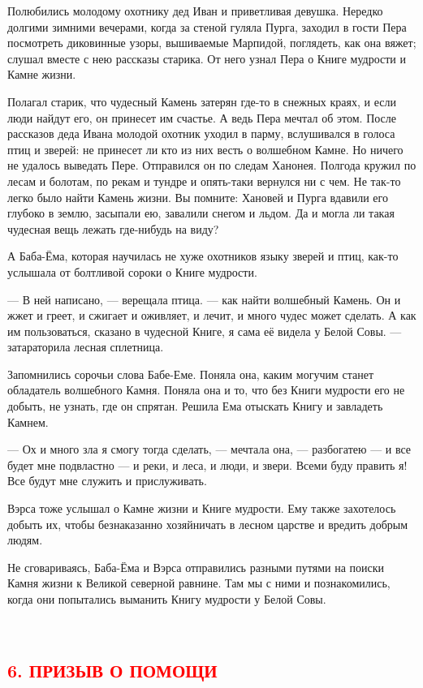 \documentclass[oneside,final,14pt]{extreport}
\begin{document}
	Полюбились молодому охотнику дед Иван и приветливая девушка. Нередко долгими зимними вечерами, когда за стеной гуляла Пурга, заходил в гости Пера посмотреть диковинные узоры, вышиваемые Марпидой, поглядеть, как она вяжет; слушал вместе с нею рассказы старика. От него узнал Пера о Книге мудрости и Камне жизни.
	
	Полагал старик, что чудесный Камень затерян где-то в снежных краях, и если люди найдут его, он принесет им счастье. А ведь Пера мечтал об этом. После рассказов деда Ивана молодой охотник уходил в парму, вслушивался в голоса птиц и зверей: не принесет ли кто из них весть о волшебном Камне. Но ничего не удалось выведать Пере. Отправился он по следам Ханонея. Полгода кружил по лесам и болотам, по рекам и тундре и опять-таки вернулся ни с чем. Не так-то легко было найти Камень жизни. Вы помните: Хановей и Пурга вдавили его глубоко в землю, засыпали ею, завалили снегом и льдом. Да и могла ли такая чудесная вещь лежать где-нибудь на виду?
	
	А Баба-Ёма, которая научилась не хуже охотников языку зверей и птиц, как-то услышала от болтливой сороки о Книге мудрости.
	
	— В ней написано, — верещала птица. — как найти волшебный Камень. Он и жжет и греет, и сжигает и оживляет, и лечит, и много чудес может сделать. А как им пользоваться, сказано в чудесной Книге, я сама её видела у Белой Совы. — затараторила лесная сплетница.
	
	Запомнились сорочьи слова Бабе-Еме. Поняла она, каким могучим станет обладатель волшебного Камня. Поняла она и то, что без Книги мудрости его не добыть, не узнать, где он спрятан. Решила Ема отыскать Книгу и завладеть Камнем.
	
	— Ох и много зла я смогу тогда сделать, — мечтала она, — разбогатею — и все будет мне подвластно — и реки, и леса, и люди, и звери. Всеми буду править я! Все будут мне служить и прислуживать.
	
	Вэрса тоже услышал о Камне жизни и Книге мудрости. Ему также захотелось добыть их, чтобы безнаказанно хозяйничать в лесном царстве и вредить добрым людям.
	
	Не сговариваясь, Баба-Ёма и Вэрса отправились разными путями на поиски Камня жизни к Великой северной равнине. Там мы с ними и познакомились, когда они попытались выманить Книгу мудрости у Белой Совы.
	
	\
	{%
		\centering
		\subsection*{\textcolor{red}{6. ПРИЗЫВ О ПОМОЩИ}}
	}
	
\end{document}
